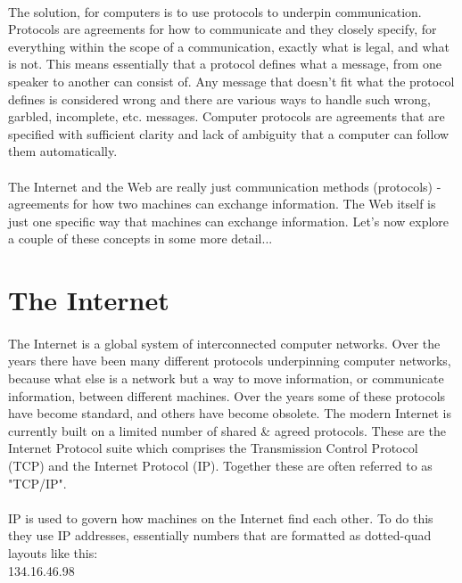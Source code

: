 \documentclass[12pt, a4paper, oneside]{book}
\begin{document}
\paragraph{} The solution, for computers is to use protocols to underpin communication. Protocols are agreements for how to communicate and they closely specify, for everything within the scope of a communication, exactly what is legal, and what is not. This means essentially that a protocol defines what a message, from one speaker to another can consist of. Any message that doesn't fit what the protocol defines is considered wrong and there are various ways to handle such wrong, garbled, incomplete, etc. messages. Computer protocols are agreements that are specified with sufficient clarity and lack of ambiguity that a computer can follow them automatically.

\paragraph{} The Internet and the Web are really just communication methods (protocols) - agreements for how two machines can exchange information. The Web itself is just one specific way that machines can exchange information. Let's now explore a couple of these concepts in some more detail...

\section{The Internet}

\paragraph{} The Internet is a global system of interconnected computer networks. Over the years there have been many different protocols underpinning computer networks, because what else is a network but a way to move information, or communicate information, between different machines. Over the years some of these protocols have become standard, and others have become obsolete. The modern Internet is currently built on a limited number of shared \& agreed protocols. These are the Internet Protocol suite which comprises the Transmission Control Protocol (TCP) and the Internet Protocol (IP). Together these are often referred to as "TCP/IP". 

\paragraph{} IP is used to govern how machines on the Internet find each other. To do this they use IP addresses, essentially numbers that are formatted as dotted-quad layouts like this:\\
	134.16.46.98
\end{document}

